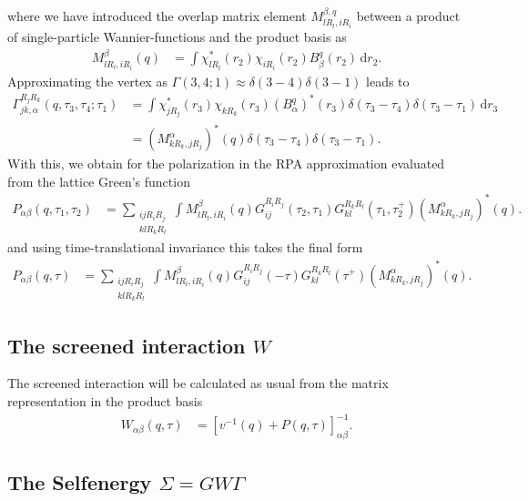 \documentclass[12pt,a4paper]{scrartcl}
\numberwithin{equation}{section}
\begin{document}
where we have introduced the overlap matrix element $M^{\beta,q}_{lR_l,iR_i}$
between a product of single-particle Wannier-functions
and the product basis as
\begin{align}
 M^{\beta}_{lR_l,iR_i}(q)
 &= \int \chi^*_{lR_l}(r_2) \chi_{iR_i}(r_2) B^{q}_{\beta}(r_2) \, \mathrm{d}r_2.
\end{align}
Approximating the vertex as $\Gamma(3,4;1) \approx \delta(3-4)\delta(3-1)$
leads to
\begin{align}
\Gamma^{R_jR_k}_{jk,\alpha}(q,\tau_3,\tau_4;\tau_1)
&= \int \chi^*_{jR_j}(r_3) \chi_{kR_k}(r_3) (B^{q}_{\alpha})^*(r_3)
    \delta(\tau_3-\tau_4)\delta(\tau_3-\tau_1)\,\mathrm{d}r_3 \\
%
&= \left(M^{\alpha}_{kR_k,jR_j}\right)^*(q) \delta(\tau_3-\tau_4)\delta(\tau_3-\tau_1).
\end{align}
With this, we obtain for the polarization in the RPA approximation
evaluated from the lattice Green's function
\begin{align}
 P_{\alpha\beta}(q,\tau_1,\tau_2)
%
&= \sum_{ \substack{ijR_iR_j \\ klR_kR_l}} \int 
     M^{\beta}_{lR_l,iR_i}(q)
      G^{R_iR_j}_{ij}(\tau_2,\tau_1) G^{R_kR_l}_{kl}(\tau_1,\tau_2^+)  
     \left(M^{\alpha}_{kR_k,jR_j}\right)^*(q).
\end{align}
and using time-translational invariance this takes the final form
\begin{align}
 P_{\alpha\beta}(q,\tau)
%
&= \sum_{ \substack{ijR_iR_j \\ klR_kR_l}} \int 
     M^{\beta}_{lR_l,iR_i}(q)
      G^{R_iR_j}_{ij}(-\tau) G^{R_kR_l}_{kl}(\tau^+)  
     \left(M^{\alpha}_{kR_k,jR_j}\right)^*(q). \label{eq:final_pol_loc_basis}
\end{align}

\subsection{The screened interaction $W$}
The screened interaction will be calculated
as usual from the matrix representation in the product basis
\begin{align}
 W_{\alpha\beta}(q,\tau)
 &= \left[ v^{-1}(q) + P(q,\tau) \right]^{-1}_{\alpha\beta}.
\end{align}


\subsection{The Selfenergy $\Sigma=GW\Gamma$}
\end{document}
